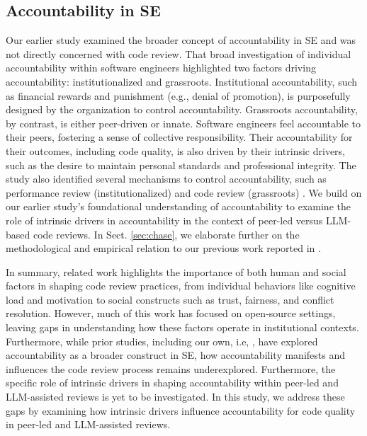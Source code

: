 \subsection{Accountability in SE}

Our earlier study \citep{alami2024understanding} examined the broader concept of accountability in SE and was not directly concerned with code review. That broad investigation of individual accountability within software engineers highlighted two factors driving accountability: institutionalized and grassroots. Institutional accountability, such as financial rewards and punishment (e.g., denial of promotion), is purposefully designed by the organization to control accountability. Grassroots accountability, by contrast, is either peer-driven or innate. Software engineers feel accountable to their peers, fostering a sense of collective responsibility. Their accountability for their outcomes, including code quality, is also driven by their intrinsic drivers, such as the desire to maintain personal standards and professional integrity. The study also identified several mechanisms to control accountability, such as performance review (institutionalized) and code review (grassroots) \citep{alami2024understanding}. We build on our earlier study's foundational understanding of accountability to examine the role of intrinsic drivers in accountability in the context of peer-led versus LLM-based code reviews. In Sect. \ref{sec:chase}, we elaborate further on the methodological and empirical relation to our previous work reported in \citep{alami2024understanding}.

In summary, related work highlights the importance of both human and social factors in shaping code review practices, from individual behaviors like cognitive load and motivation to social constructs such as trust, fairness, and conflict resolution. However, much of this work has focused on open-source settings, leaving gaps in understanding how these factors operate in institutional contexts. Furthermore, while prior studies, including our own, i.e, \citep{alami2024understanding}, have explored accountability as a broader construct in SE, how accountability manifests and influences the code review process remains underexplored. Furthermore, the specific role of intrinsic drivers in shaping accountability within peer-led and LLM-assisted reviews is yet to be investigated. In this study, we address these gaps by examining how intrinsic drivers influence accountability for code quality in peer-led and LLM-assisted reviews.
